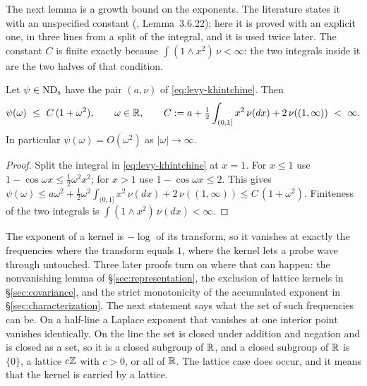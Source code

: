 The next lemma is a growth bound on the exponents. The literature states it with an
unspecified constant (, Lemma~3.6.22); here it is proved with an
explicit one, in three lines from a split of the integral, and it is used twice later. The
constant $C$ is finite exactly because $\int (1 \wedge x^2)\,\nu < \infty$: the two
integrals inside it are the two halves of that condition.

\begin{lemma}
\label{lem:quadratic-growth}
Let $\psi \in \mathrm{ND}_{\mathrm{s}}$ have the pair $(a,\nu)$ of \ref{eq:levy-khintchine}. Then
\[
  \psi(\omega) \ \le\ C\,(1 + \omega^2), \qquad \omega \in \mathbb{R},
  \qquad C := a + \tfrac12\int_{(0,1]} x^2\,\nu(dx) + 2\,\nu((1,\infty)) \ < \ \infty .
\]
In particular $\psi(\omega) = O(\omega^2)$ as $|\omega| \to \infty$.
\end{lemma}

\begin{proof}
Split the integral in \ref{eq:levy-khintchine} at $x = 1$. For $x \le 1$ use
$1 - \cos\omega x \le \tfrac12\omega^2x^2$; for $x > 1$ use $1 - \cos\omega x \le 2$. This
gives
$\psi(\omega) \le a\omega^2 + \tfrac12\omega^2\int_{(0,1]}x^2\,\nu(dx) + 2\,\nu((1,\infty))
\le C\,(1+\omega^2)$. Finiteness of the two integrals is
$\int (1 \wedge x^2)\,\nu(dx) < \infty$.
\end{proof}

The exponent of a kernel is $-\log$ of its transform, so it vanishes at exactly the
frequencies where the transform equals $1$, where the kernel lets a probe wave through
untouched. Three later proofs turn on where that can happen: the nonvanishing lemma of
\S\ref{sec:representation}, the exclusion of lattice kernels in \S\ref{sec:covariance}, and
the strict monotonicity of the accumulated exponent in \S\ref{sec:characterization}. The
next statement says what the set of such frequencies can be. On a half-line a Laplace
exponent that vanishes at one interior point vanishes identically. On the line the set is
closed under addition and negation and is closed as a set, so it is a closed subgroup of
$\mathbb{R}$, and a closed subgroup of $\mathbb{R}$ is $\{0\}$, a lattice $c\mathbb{Z}$ with $c > 0$, or all of
$\mathbb{R}$. The lattice case does occur, and it means that the kernel is carried by a lattice.

